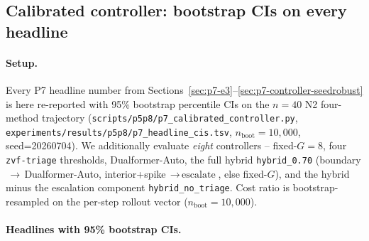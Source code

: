 \subsection{Calibrated controller: bootstrap CIs on every headline}
\label{sec:p7-calibrated}
\paragraph{Setup.}
Every P7 headline number from Sections~\ref{sec:p7-e3}--\ref{sec:p7-controller-seedrobust}
is here re-reported with 95\% bootstrap percentile CIs on the
$n{=}40$ N2 four-method trajectory
(\texttt{scripts/p5p8/p7\_calibrated\_controller.py},
\texttt{experiments/results/p5p8/p7\_headline\_cis.tsv},
$n_{\text{boot}}{=}10{,}000$, seed=20260704). We additionally
evaluate \emph{eight} controllers -- fixed-$G{=}8$, four
\texttt{zvf-triage} thresholds, Dualformer-Auto, the full hybrid
\texttt{hybrid\_0.70} (boundary$\,\to\,$Dualformer-Auto,
interior+spike$\,\to\,\text{escalate}$, else fixed-$G$), and the
hybrid minus the escalation component \texttt{hybrid\_no\_triage}.
Cost ratio is bootstrap-resampled on the per-step rollout vector
($n_{\text{boot}}{=}10{,}000$).

\paragraph{Headlines with 95\% bootstrap CIs.}


